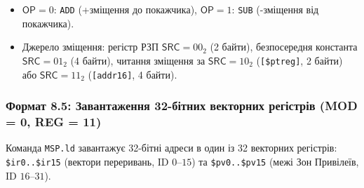 \documentclass[11pt,a4paper]{article}
\newcommand{\field}[1]{\textsf{#1}}
\begin{document}
\begin{center}
\end{center}

\begin{itemize}
  \item $\field{OP} = 0$: \texttt{ADD} (+зміщення до покажчика), $\field{OP} = 1$: \texttt{SUB} (-зміщення від покажчика).
  \item Джерело зміщення: регістр РЗП $\field{SRC}=00_2$ (2 байти), безпосередня константа $\field{SRC}=01_2$ (4 байти), читання зміщення за $\field{SRC}=10_2$ (\texttt{[\$ptreg]}, 2 байти) або $\field{SRC}=11_2$ (\texttt{[addr16]}, 4 байти).
\end{itemize}

\subsubsection{Формат 8.5: Завантаження 32-бітних векторних регістрів (MOD = 0, REG = 11)}
Команда \texttt{MSP.ld} завантажує 32-бітні адреси в один із 32 векторних регістрів: \texttt{\$ir0..\$ir15} (вектори переривань, ID $0$--$15$) та \texttt{\$pv0..\$pv15} (межі Зон Привілеїв, ID $16$--$31$).
\end{document}
